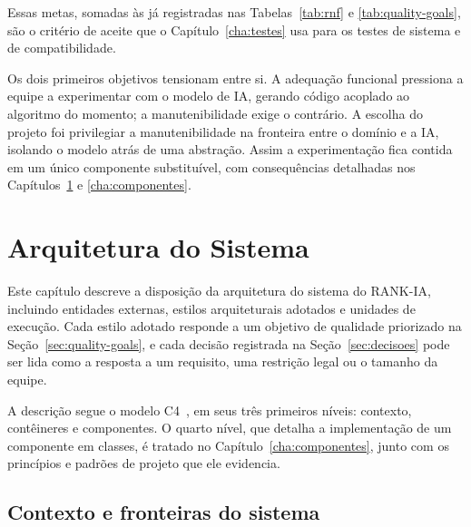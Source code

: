 \documentclass[a4paper,12pt,oneside,openany]{book}
\newif\iforientacoes
\newcommand{\orientacao}[1]{%
    \iforientacoes
        \begin{quote}
        \small\itshape\textbf{Orientação:} #1
        \end{quote}
    \fi
}
\begin{document}
Essas metas, somadas às já registradas nas Tabelas~\ref{tab:rnf} e
\ref{tab:quality-goals}, são o critério de aceite que o
Capítulo~\ref{cha:testes} usa para os testes de sistema e de compatibilidade.

Os dois primeiros objetivos tensionam entre si. A adequação funcional pressiona
a equipe a experimentar com o modelo de IA, gerando código acoplado ao
algoritmo do momento; a manutenibilidade exige o contrário. A escolha do
projeto foi privilegiar a manutenibilidade na fronteira entre o domínio e a IA,
isolando o modelo atrás de uma abstração. Assim a experimentação fica contida
em um único componente substituível, com consequências detalhadas nos
Capítulos~\ref{cha:arquitetura} e \ref{cha:componentes}.

\chapter{Arquitetura do Sistema}\label{cha:arquitetura}

\orientacao{Apresentem a arquitetura proposta e justifiquem as principais
decisões. O leitor deve conseguir compreender a estrutura geral do sistema
antes de entrar nos detalhes de seus componentes.}

Este capítulo descreve a disposição da arquitetura do sistema do RANK-IA, incluindo
entidades externas, estilos arquiteturais adotados e unidades de execução.
Cada estilo adotado responde a um objetivo de qualidade priorizado na 
Seção~\ref{sec:quality-goals}, e cada decisão registrada na Seção~\ref{sec:decisoes} 
pode ser lida como a resposta a um requisito, uma restrição legal ou o tamanho da equipe.

A descrição segue o modelo C4~\citep{c4model}, em seus três primeiros níveis:
contexto, contêineres e componentes. O quarto nível, que detalha a
implementação de um componente em classes, é tratado no
Capítulo~\ref{cha:componentes}, junto com os princípios e padrões de projeto
que ele evidencia.

\section{Contexto e fronteiras do sistema}

\orientacao{Apresentem um diagrama de contexto mostrando o sistema, seus
principais usuários e os sistemas externos com os quais ele se comunica.
Expliquem as relações mostradas no diagrama.}
\end{document}
